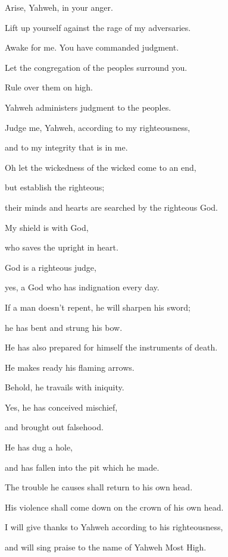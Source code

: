 {\Q {}Arise, Yahweh, in your anger.
\par }{\QB Lift up yourself against the rage of my adversaries.
\par }{\Q Awake for me. You have commanded judgment.
\par }{\QB {}Let the congregation of the peoples surround you.
\par }{\QB Rule over them on high.
\par }{\Q {}Yahweh administers judgment to the peoples.
\par }{\QB Judge me, Yahweh, according to my righteousness,
\par }{\QB and to my integrity that is in me.
\par }{\Q {}Oh let the wickedness of the wicked come to an end,
\par }{\QB but establish the righteous;
\par }{\QB their minds and hearts are searched by the righteous God.
\par }{\Q {}My shield is with God,
\par }{\QB who saves the upright in heart.
\par }{\Q {}God is a righteous judge,
\par }{\QB yes, a God who has indignation every day.
\par }{\Q {}If a man doesn’t repent, he will sharpen his sword;
\par }{\QB he has bent and strung his bow.
\par }{\Q {}He has also prepared for himself the instruments of death.
\par }{\QB He makes ready his flaming arrows.
\par }{\Q {}Behold, he travails with iniquity.
\par }{\QB Yes, he has conceived mischief,
\par }{\QB and brought out falsehood.
\par }{\Q {}He has dug a hole,
\par }{\QB and has fallen into the pit which he made.
\par }{\Q {}The trouble he causes shall return to his own head.
\par }{\QB His violence shall come down on the crown of his own head.
\par }{\Q {}I will give thanks to Yahweh according to his righteousness,
\par }{\QB and will sing praise to the name of Yahweh Most High.

}
